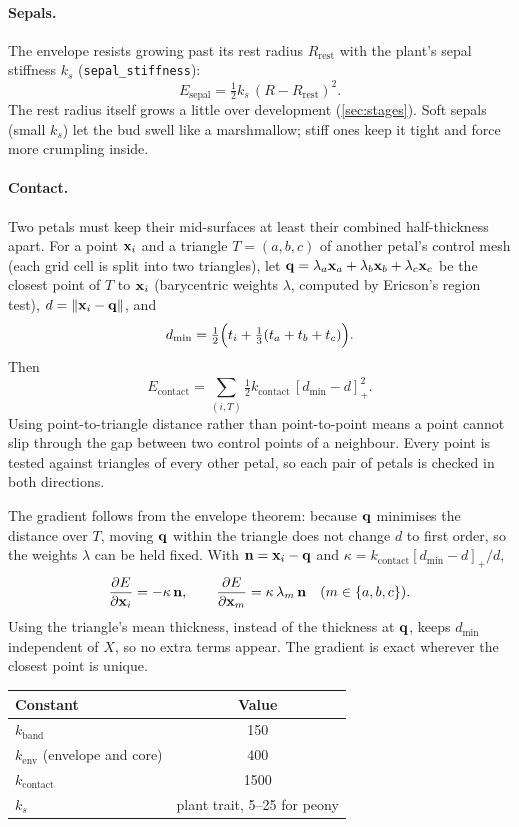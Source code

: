\paragraph{Sepals.} The envelope resists growing past its rest radius
$R_{\mathrm{rest}}$ with the plant's sepal stiffness $k_s$ (\texttt{sepal\_\allowbreak stiffness}):
\[
  E_{\mathrm{sepal}} = \tfrac12 k_s\,(R - R_{\mathrm{rest}})^2 .
\]
The rest radius itself grows a little over development (\cref{sec:stages}).
Soft sepals (small $k_s$) let the bud swell like a marshmallow; stiff ones keep
it tight and force more crumpling inside.

\paragraph{Contact.} Two petals must keep their mid-surfaces at least their
combined half-thickness apart. For a point $\mathbf{x}_i$ and a triangle
$T = (a,b,c)$ of another petal's control mesh (each grid cell is split into two
triangles), let $\mathbf{q} = \lambda_a\mathbf{x}_a + \lambda_b\mathbf{x}_b + \lambda_c\mathbf{x}_c$ be the
closest point of $T$ to $\mathbf{x}_i$ (barycentric weights $\lambda$, computed by
Ericson's region test), $d = \lVert\mathbf{x}_i - \mathbf{q}\rVert$, and
\[
  d_{\min} = \tfrac12\Bigl(t_i + \tfrac13(t_a + t_b + t_c)\Bigr).
\]
Then
\[
  E_{\mathrm{contact}} = \sum_{(i,T)} \tfrac12 k_{\mathrm{contact}}\,[d_{\min} - d]_+^2 .
\]
Using point-to-triangle distance rather than point-to-point means a point cannot
slip through the gap between two control points of a neighbour. Every point is
tested against triangles of every other petal, so each pair of petals is
checked in both directions.

The gradient follows from the envelope theorem: because $\mathbf{q}$ minimises the
distance over $T$, moving $\mathbf{q}$ within the triangle does not change $d$ to
first order, so the weights $\lambda$ can be held fixed. With
$\mathbf{n} = \mathbf{x}_i - \mathbf{q}$ and $\kappa = k_{\mathrm{contact}}[d_{\min}-d]_+/d$,
\[
  \frac{\partial E}{\partial \mathbf{x}_i} = -\kappa\,\mathbf{n},
  \qquad
  \frac{\partial E}{\partial \mathbf{x}_m} = \kappa\,\lambda_m\,\mathbf{n} \quad (m\in\{a,b,c\}).
\]
Using the triangle's mean thickness, instead of the thickness at $\mathbf{q}$,
keeps $d_{\min}$ independent of $X$, so no extra terms appear. The gradient is
exact wherever the closest point is unique.

\begin{center}\small
\begin{tabular}{@{}lc@{}}
\toprule
Constant & Value \\
\midrule
$k_{\mathrm{band}}$ & 150 \\
$k_{\mathrm{env}}$ (envelope and core) & 400 \\
$k_{\mathrm{contact}}$ & 1500 \\
$k_s$ & plant trait, 5--25 for peony \\
\bottomrule
\end{tabular}
\end{center}

